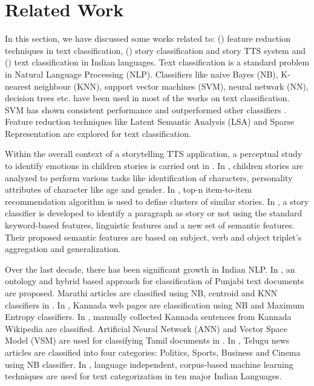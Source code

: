 \documentclass[times, 11pt, a4paper]{article}
\begin{document}
 

\section{Related Work}

In this section, we have discussed some works related to: () feature reduction techniques in text classification, () story classification and story TTS system and () text classification in Indian languages. Text classification is a standard problem in Natural Language Processing (NLP). Classifiers like naive Bayes (NB), K-nearest neighbour (KNN), support vector machines (SVM), neural network (NN), decision trees etc. have been used in most of the works on text classification. SVM has shown consistent performance and outperformed other classifiers \cite{joachims1998text,yang1999re}. Feature reduction techniques like Latent Semantic Analysis (LSA) \cite{moldovan2005latent} and Sparse Representation \cite{sainath2010sparse} are explored for text classification. 

Within the overall context of a storytelling TTS application, a perceptual study to identify emotions in children stories is carried out in \cite{alm2005perceptions}. In \cite{iosif2014speaker}, children stories are analyzed to perform various tasks like identification of characters, personality attributes of character like age and gender. In \cite{lobo2010fairy}, top-n item-to-item recommendation algorithm is used to define clusters of similar stories. In \cite{ceran2012semantic}, a story classifier is developed to identify a paragraph as story or not using the standard keyword-based features, linguistic features and a new set of semantic features. Their proposed semantic features are based on subject, verb and object triplet's aggregation and generalization. 

Over the last decade, there has been significant growth in Indian NLP. In \cite{nidhi2012domain}, an ontology and hybrid based approach for classification of Punjabi text documents are proposed. Marathi articles are classified using NB, centroid and KNN classifiers in \cite{game2014comparison}. In \cite{deepamala2014text}, Kannada web pages are classification using NB and Maximum Entropy classifiers. In \cite{jayashree2011analysis}, manually collected Kannada sentences from Kannada Wikipedia are classified. Artificial Neural Network (ANN) and Vector Space Model (VSM) are used for classifying Tamil documents in \cite{rajan2009automatic}. In \cite{murthy2003automatic}, Telugu news articles are classified into four categories: Politics, Sports, Business and Cinema using NB classifier. In \cite{raghuveer2007text}, language independent, corpus-based machine learning techniques are used for text categorization in ten major Indian Languages. 
\end{document}
